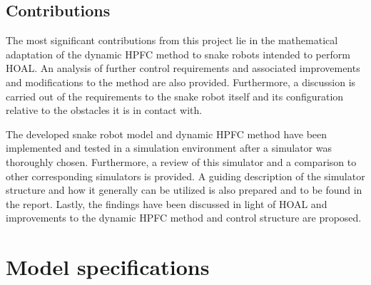 





\subsection{Contributions}

The most significant contributions from this project lie in the mathematical adaptation of the dynamic HPFC method to snake robots intended to perform HOAL. An analysis of further control requirements and associated improvements and modifications to the method are also provided. Furthermore, a discussion is carried out of the requirements to the snake robot itself and its configuration relative to the obstacles it is in contact with.

The developed snake robot model and dynamic HPFC method have been implemented and tested in a simulation environment after a simulator was thoroughly chosen. Furthermore, a review of this simulator and a comparison to other corresponding simulators is provided. A guiding description of the simulator structure and how it generally can be utilized is also prepared and to be found in the report. Lastly, the findings have been discussed in light of HOAL and improvements to the dynamic HPFC method and control structure are proposed.


\section{Model specifications} \label{ch:model_specs}

